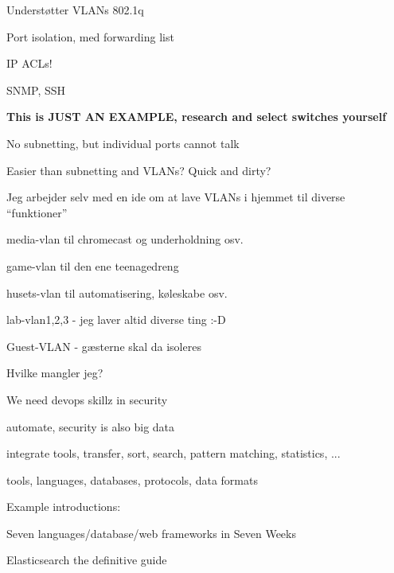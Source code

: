 \documentclass[20pt,landscape,a4paper,footrule]{foils}
\begin{document}

\begin{list1}
\item Understøtter VLANs 802.1q
\item Port isolation, med forwarding list
\item IP ACLs!
\item SNMP, SSH
\end{list1}

\centerline{\bf This is JUST AN EXAMPLE, research and select switches yourself}



No subnetting, but individual ports cannot talk

Easier than subnetting and VLANs?  Quick and dirty? \smiley


Jeg arbejder selv med en ide om at lave VLANs i hjemmet til diverse “funktioner”
\begin{list1}

\item media-vlan til chromecast og underholdning osv.

\item game-vlan til den ene teenagedreng

\item husets-vlan til automatisering, køleskabe osv.

\item lab-vlan1,2,3 - jeg laver altid diverse ting :-D

\item Guest-VLAN - gæsterne skal da isoleres
\end{list1}

\vskip 2cm

\centerline{Hvilke mangler jeg?}






\begin{list1}
\item We need devops skillz in security
\item automate, security is also big data
\item integrate tools, transfer, sort, search, pattern matching, statistics, ...
\item tools, languages, databases, protocols, data formats
\item Example introductions:
\begin{list2}
\item Seven languages/database/web frameworks in Seven Weeks
\item Elasticsearch the definitive guide\\
\item {}
\item {}
\end{list2}
\end{list1}
\end{document}
